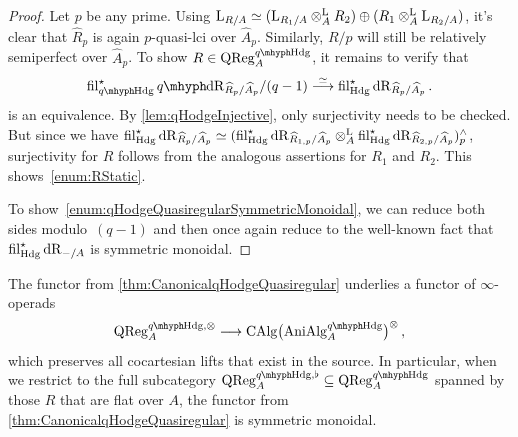 \documentclass[DIV=12,numbers=enddot,leqno,bibliography=totoc]{scrartcl}
\begin{document}
	\begin{proof}
		Let $p$ be any prime. Using $\mathrm{L}_{R/A}\simeq (\mathrm{L}_{R_1/A}\otimes^{\mathrm{L}}_A R_2)\oplus (R_1\otimes^{\mathrm{L}}_A\mathrm{L}_{R_2/A})$, it's clear that $\widehat{R}_p$ is again $p$-quasi-lci over $\widehat{A}_p$. Similarly, $R/p$ will still be relatively semiperfect over $\widehat{A}_p$. To show $R\in\cat{QReg}_A^{\qHodge}$, it remains to verify that
		\begin{equation*}
			\fil_{\qHodge}^\star\qdeRham_{\smash{\widehat{R}}_p/\smash{\widehat{A}}_p}/(q-1)\overset{\simeq}{\longrightarrow}\fil_{\Hodge}^\star\deRham_{\smash{\widehat{R}}_p/\smash{\widehat{A}}_p}\,.
		\end{equation*}
		is an equivalence. By \cref{lem:qHodgeInjective}, only surjectivity needs to be checked. But since we have $\operatorname{fil}_{\mathrm{Hdg}}^\star \mathrm{dR}_{\smash{\widehat{R}}_p/\smash{\widehat{A}}_p}\simeq (\operatorname{fil}_{\mathrm{Hdg}}^\star \mathrm{dR}_{\smash{\widehat{R}}_{1,p}/\smash{\widehat{A}}_p}\otimes^{\mathrm{L}}_A \operatorname{fil}_{\mathrm{Hdg}}^\star \mathrm{dR}_{\smash{\widehat{R}}_{2,p}/\smash{\widehat{A}}_p})_p^\wedge$, surjectivity for $R$ follows from the analogous assertions for $R_1$ and $R_2$. This shows~\cref{enum:RStatic}.
		
		To show~\cref{enum:qHodgeQuasiregularSymmetricMonoidal}, we can reduce both sides modulo~$(q-1)$ and then once again reduce to the well-known fact that $\operatorname{fil}_{\mathrm{Hdg}}^\star\mathrm{dR}_{-/A}$ is symmetric monoidal.
	\end{proof}
	\begin{cor}\label{cor:CanonicalqHodgeQuasiRegularMonoidal}
		The functor from \cref{thm:CanonicalqHodgeQuasiregular} underlies a functor of $\infty$-operads
		\begin{equation*}
			\cat{QReg}_{A}^{\qHodge,\otimes}\longrightarrow \CAlg\bigl(\cat{AniAlg}_A^{\qHodge}\bigr)^{\otimes}\,,
		\end{equation*}		
		which preserves all cocartesian lifts that exist in the source. In particular, when we restrict to the full subcategory $\cat{QReg}_A^{\qHodge,\flat}\subseteq \cat{QReg}_A^{\qHodge}$ spanned by those $R$ that are flat over $A$, the functor from \cref{thm:CanonicalqHodgeQuasiregular} is symmetric monoidal.
	\end{cor}
\end{document}
